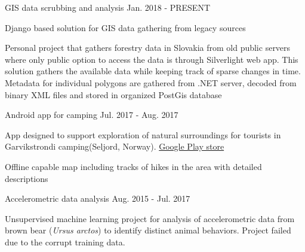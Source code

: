 
\begin{cventries}
  \cventry
    {} %
    {GIS data scrubbing and analysis} %
    {} %
    {Jan. 2018 - PRESENT} %
    {
      \begin{cvitems} %
        \item {Django based solution for GIS data gathering from legacy sources}
		\item {Personal project that gathers forestry data in Slovakia from old public servers where only public option to access the data is through Silverlight web app. This solution gathers the available data while keeping track of sparse changes in time. Metadata for individual polygons are gathered from .NET server, decoded from binary XML files and stored in organized PostGis database}
      \end{cvitems}
    }

  \cventry
    {} %
    {Android app for camping} %
    {} %
    {Jul. 2017 - Aug. 2017} %
    {
      \begin{cvitems} %
      	\item {App designed to support exploration of natural surroundings for tourists in Garvikstrondi camping(Seljord, Norway). \href{https://play.google.com/store/apps/details?id=sk.malobysa.www.garvikstronditur&hl=en}{Google Play store}}
      	\item {Offline capable map including tracks of hikes in the area with detailed descriptions}
      \end{cvitems}
    }

  \cventry
    {} %
    {Accelerometric data analysis} %
    {} %
    {Aug. 2015 - Jul. 2017} %
    {
      \begin{cvitems} %
      	\item {Unsupervised machine learning project for analysis of accelerometric data from brown bear (\textit{Ursus arctos}) to identify distinct animal behaviors. Project failed due to the corrupt training data.}
      \end{cvitems}
    }
\end{cventries}
